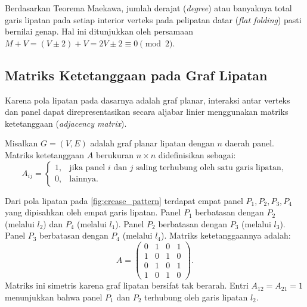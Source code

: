 Berdasarkan Teorema Maekawa, jumlah derajat (\textit{degree}) atau banyaknya total garis lipatan pada setiap interior verteks pada pelipatan datar (\textit{flat folding}) pasti bernilai genap. Hal ini ditunjukkan oleh persamaan $M + V = (V \pm 2) + V = 2V \pm 2 \equiv 0 \pmod 2$.

\subsection{Matriks Ketetanggaan pada Graf Lipatan}
Karena pola lipatan pada dasarnya adalah graf planar, interaksi antar verteks dan panel dapat direpresentasikan secara aljabar linier menggunakan matriks ketetanggaan (\textit{adjacency matrix}).
\begin{definisi}
  Misalkan $G = (V, E)$ adalah graf planar lipatan dengan $n$ daerah panel. Matriks ketetanggaan $A$ berukuran $n \times n$ didefinisikan sebagai:
  \[
    A_{ij} = 
    \begin{cases}
      1, & \text{jika panel } i \text{ dan } j \text{ saling terhubung oleh satu garis lipatan}, \\
      0, & \text{lainnya}.
    \end{cases}
  \]
\end{definisi}

\begin{contoh}
  Dari pola lipatan pada \ref{fig:crease_pattern} terdapat empat panel $P_1, P_2, P_3, P_4$ yang dipisahkan oleh empat garis lipatan. Panel $P_1$ berbatasan dengan $P_2$ (melalui $l_2$) dan $P_4$ (melalui $l_1$). Panel $P_2$ berbatasan dengan $P_3$ (melalui $l_3$). Panel $P_3$ berbatasan dengan $P_4$ (melalui $l_4$). Matriks ketetanggaannya adalah:
  \[
    A = \begin{pmatrix}
      0 & 1 & 0 & 1 \\
      1 & 0 & 1 & 0 \\
      0 & 1 & 0 & 1 \\
      1 & 0 & 1 & 0
    \end{pmatrix}.
  \]
  Matriks ini simetris karena graf lipatan bersifat tak berarah. Entri $A_{12} = A_{21} = 1$ menunjukkan bahwa panel $P_1$ dan $P_2$ terhubung oleh garis lipatan $l_2$.
\end{contoh}


